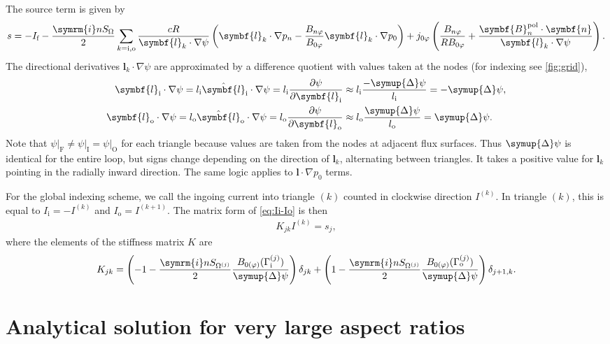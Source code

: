 \documentclass[a4paper, 10pt, english]{article}
\let\temp\varrho
\let\varrho\rho
\let\rho\temp
\let\temp\vartheta
\let\vartheta\theta
\let\theta\temp
\let\temp\varphi
\let\varphi\phi
\let\phi\temp
\let\vec\symbf
\newcommand*\im{\ensuremath{\symrm{i}}}  %
\newcommand*\pd[2][]{\ensuremath{\frac{\partial #1}{\partial #2}}}  %
\newcommand*\pol{\ensuremath{\textrm{pol}}}  %
\newcommand*\fs{\ensuremath{\textrm{f}}}  %
\newcommand*\inw{\ensuremath{\textrm{i}}}  %
\newcommand*\out{\ensuremath{\textrm{o}}}  %
\newcommand*\vfs{\ensuremath{\textrm{F}}}  %
\newcommand*\vinw{\ensuremath{\textrm{I}}}  %
\newcommand*\vout{\ensuremath{\textrm{O}}}  %
\begin{document}
The source term is given by
\begin{gather}
  s = -I_{\fs} - \frac{\im n S_{\Omega}}{2} \sum_{k = \inw, \out} \frac{c R}{\vec{l}_{k} \cdot \nabla \psi} \left( \vec{l}_{k} \cdot \nabla p_{n} - \frac{B_{n \phi}}{B_{0 \phi}} \vec{l}_{k} \cdot \nabla p_{0} \right) + j_{0 \phi} \left( \frac{B_{n \phi}}{R B_{0 \phi}} + \frac{\vec{B}_{n}^{\pol} \cdot \vec{n}}{\vec{l}_{k} \cdot \nabla \psi} \right).
\end{gather}
The directional derivatives $\vec{l}_{k} \cdot \nabla \psi$ are approximated by a difference quotient with values taken at the nodes (for indexing see \cref{fig:grid}),
\begin{align}
  \vec{l}_{\inw} \cdot \nabla \psi = l_{\inw} \hat{\vec{l}}_{\inw} \cdot \nabla \psi = l_{\inw} \pd[\psi]{\vec{l}_{\inw}} & \approx l_{\inw} \frac{-\symup{\Delta} \psi}{l_{\inw}} = -\symup{\Delta} \psi, \\
  \vec{l}_{\out} \cdot \nabla \psi = l_{\out} \hat{\vec{l}}_{\out} \cdot \nabla \psi = l_{\out} \pd[\psi]{\vec{l}_{\out}} & \approx l_{\out} \frac{\symup{\Delta} \psi}{l_{\out}} = \symup{\Delta} \psi.
\end{align}
Note that $\psi \vert_{\vfs} \neq \psi \vert_{\vinw} = \psi \vert_{\vout}$ for each triangle because values are taken from the nodes at adjacent flux surfaces. Thus $\symup{\Delta} \psi$ is identical for the entire loop, but signs change depending on the direction of $\vec{l}_{k}$, alternating between triangles. It takes a positive value for $\vec{l}_{k}$ pointing in the radially inward direction. The same logic applies to $\vec{l} \cdot \nabla p_{0}$ terms.

For the global indexing scheme, we call the ingoing current into triangle $(k)$ counted in clockwise direction $I^{(k)}$. In triangle $(k)$, this is equal to $I_{\inw} = -I^{(k)}$ and $I_{\out} = I^{(k+1)}$. The matrix form of \cref{eq:Ii-Io} is then
\begin{gather}
  K_{jk} I^{(k)} = s_{j},
\end{gather}
where the elements of the stiffness matrix $K$ are
\begin{gather}
  K_{jk} = \left( -1 - \frac{\im n S_{\Omega^{(j)}}}{2} \frac{B_{0 (\phi)} (\Gamma_{\inw}^{(j)})}{\symup{\Delta} \psi} \right) \delta_{jk} + \left( 1 - \frac{\im n S_{\Omega^{(j)}}}{2} \frac{B_{0 (\phi)} (\Gamma_{\out}^{(j)})}{\symup{\Delta} \psi} \right) \delta_{j+1, k}.
\end{gather}

\section{Analytical solution for very large aspect ratios}
\end{document}
